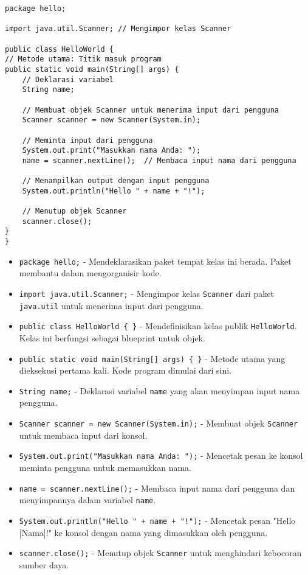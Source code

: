 \begin{lstlisting}[style=JavaStyle, caption={Contoh Program HelloWorld.java}]
package hello;

import java.util.Scanner; // Mengimpor kelas Scanner

public class HelloWorld {
// Metode utama: Titik masuk program
public static void main(String[] args) {
	// Deklarasi variabel
	String name;
	
	// Membuat objek Scanner untuk menerima input dari pengguna
	Scanner scanner = new Scanner(System.in);
	
	// Meminta input dari pengguna
	System.out.print("Masukkan nama Anda: ");
	name = scanner.nextLine();  // Membaca input nama dari pengguna
	
	// Menampilkan output dengan input pengguna
	System.out.println("Hello " + name + "!");
	
	// Menutup objek Scanner
	scanner.close();
}
}
\end{lstlisting}


\begin{itemize}
\item \texttt{package hello;} - Mendeklarasikan paket tempat kelas ini berada. Paket membantu dalam mengorganisir kode.
\item \texttt{import java.util.Scanner;} - Mengimpor kelas \texttt{Scanner} dari paket \texttt{java.util} untuk menerima input dari pengguna.
\item \texttt{public class HelloWorld \{ \}} - Mendefinisikan kelas publik \texttt{HelloWorld}. Kelas ini berfungsi sebagai blueprint untuk objek.
\item \texttt{public static void main(String[] args) \{ \}} - Metode utama yang dieksekusi pertama kali. Kode program dimulai dari sini.
\item \texttt{String name;} - Deklarasi variabel \texttt{name} yang akan menyimpan input nama pengguna.
\item \texttt{Scanner scanner = new Scanner(System.in);} - Membuat objek \texttt{Scanner} untuk membaca input dari konsol.
\item \texttt{System.out.print("Masukkan nama Anda: ");} - Mencetak pesan ke konsol meminta pengguna untuk memasukkan nama.
\item \texttt{name = scanner.nextLine();} - Membaca input nama dari pengguna dan menyimpannya dalam variabel \texttt{name}.
\item \texttt{System.out.println("Hello " + name + "!");} - Mencetak pesan "Hello [Nama]!" ke konsol dengan nama yang dimasukkan oleh pengguna.
\item \texttt{scanner.close();} - Menutup objek \texttt{Scanner} untuk menghindari kebocoran sumber daya.
\end{itemize}

